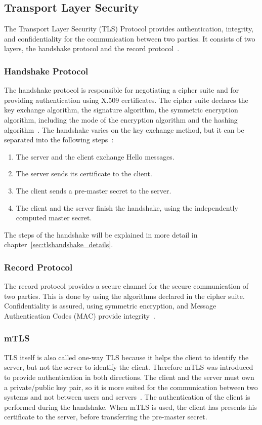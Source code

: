 \subsection{Transport Layer Security}
The Transport Layer Security (TLS) Protocol provides authentication, integrity, and confidentiality for the communication between two parties.
It consists of two layers, the handshake protocol and the record protocol~\cite{turnertls}.

\subsubsection{Handshake Protocol}
The handshake protocol is responsible for negotiating a cipher suite and for providing authentication using X.509 certificates.
The cipher suite declares the key exchange algorithm, the signature algorithm, the symmetric encryption algorithm, including the mode of the encryption algorithm and the hashing algorithm~\cite{turnertls, kurbatov2021design}.
The handshake varies on the key exchange method, but it can be separated into the following steps~\cite{krawczyk2013security}:
\begin{enumerate}
    \item The server and the client exchange Hello messages.
    \item The server sends its certificate to the client.
    \item The client sends a pre-master secret to the server.
    \item The client and the server finish the handshake, using the independently computed master secret.
\end{enumerate}
The steps of the handshake will be explained in more detail in chapter~\ref{sec:tlshandshake_details}.

\subsubsection{Record Protocol}
The record protocol provides a secure channel for the secure communication of two parties.
This is done by using the algorithms declared in the cipher suite.
Confidentiality is assured, using symmetric encryption, and Message Authentication Codes (MAC) provide integrity~\cite{kurbatov2021design, krawczyk2013security}.

\subsubsection{mTLS} \label{sec:mtls}
TLS itself is also called one-way TLS because it helps the client to identify the server, but not the server to identify the client.
Therefore mTLS was introduced to provide authentication in both directions.
The client and the server must own a private/public key pair, so it is more suited for the communication between two systems and not between users and servers~\cite{dias2020microservices}. 
The authentication of the client is performed during the handshake.
When mTLS is used, the client has presents his certificate to the server, before transferring the pre-master secret.

